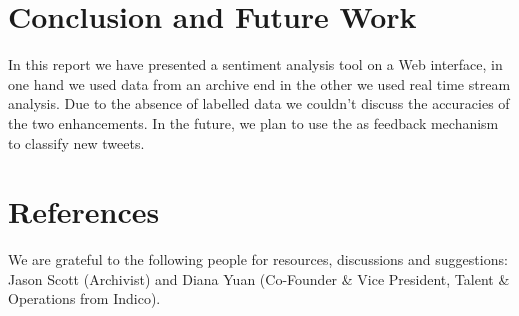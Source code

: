 \documentclass{acmtog} %
\begin{document}
\begin{table}[h!]

\label{tab:cross_tab}
\end{table}


\section{Conclusion and Future Work}
\label{sec:conclusion}

In this report we have presented a sentiment analysis tool on a Web interface, in one hand we used data from an archive end in the other we used real time stream analysis. Due to the absence of labelled data we couldn’t discuss the accuracies of the two enhancements. In the future, we plan to use the as feedback mechanism to classify new tweets.


\section{References}

\begin{acks}
We are grateful to the following people for resources, discussions and suggestions: Jason Scott (Archivist) and Diana Yuan (Co-Founder & Vice President, Talent & Operations from Indico).
\end{acks}





\end{document}
